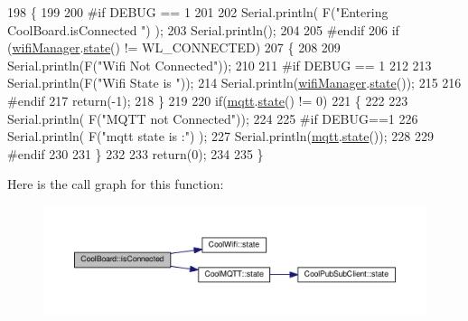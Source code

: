 \begin{DoxyCode}
198 \{
199 
200 \textcolor{preprocessor}{#if DEBUG == 1  }
201 
202     Serial.println( F(\textcolor{stringliteral}{"Entering CoolBoard.isConnected "}) );
203     Serial.println();
204 
205 \textcolor{preprocessor}{#endif}
206     \textcolor{keywordflow}{if} (\hyperlink{class_cool_board_acd88e6003606b47479ebba81e4aceeca}{wifiManager}.\hyperlink{class_cool_wifi_a1c7b4d82a4098d346e7593dce92039fa}{state}() != WL\_CONNECTED)
207     \{
208     
209         Serial.println(F(\textcolor{stringliteral}{"Wifi Not Connected"}));
210 
211 \textcolor{preprocessor}{    #if DEBUG == 1}
212 
213         Serial.println(F(\textcolor{stringliteral}{"Wifi State is "}));
214         Serial.println(\hyperlink{class_cool_board_acd88e6003606b47479ebba81e4aceeca}{wifiManager}.\hyperlink{class_cool_wifi_a1c7b4d82a4098d346e7593dce92039fa}{state}());
215         
216 \textcolor{preprocessor}{    #endif}
217         \textcolor{keywordflow}{return}(-1);
218     \}
219     
220     \textcolor{keywordflow}{if}(\hyperlink{class_cool_board_a2399f44d7c23c1149a335cb3b46d90f1}{mqtt}.\hyperlink{class_cool_m_q_t_t_a5d003307eff78efbd585e42b43b72b6d}{state}() != 0)
221     \{
222         
223         Serial.println( F(\textcolor{stringliteral}{"MQTT not Connected"}));
224 
225 \textcolor{preprocessor}{    #if DEBUG==1}
226         Serial.println( F(\textcolor{stringliteral}{"mqtt state is :"}) );
227         Serial.println(\hyperlink{class_cool_board_a2399f44d7c23c1149a335cb3b46d90f1}{mqtt}.\hyperlink{class_cool_m_q_t_t_a5d003307eff78efbd585e42b43b72b6d}{state}());  
228     
229 \textcolor{preprocessor}{    #endif}
230 
231     \}
232     
233     \textcolor{keywordflow}{return}(0);
234 
235 \}
\end{DoxyCode}
Here is the call graph for this function\+:\nopagebreak
\begin{figure}[H]
\begin{center}
\leavevmode
\includegraphics[width=350pt]{d7/df9/class_cool_board_ad7442cf4b62c7b0d5bd62a0f75ffc065_cgraph}
\end{center}
\end{figure}
\mbox{\label{class_cool_board_ae6b5e1274d760462290192acea4adca8}} 
